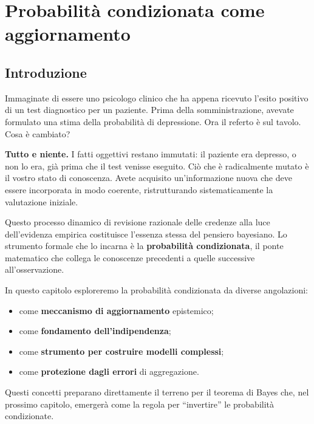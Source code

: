 \documentclass[
  italian,
  letterpaper,
  a4paper,
  11pt,
  open=any]{scrbook}
\providecommand{\tightlist}{%
  \setlength{\itemsep}{0pt}\setlength{\parskip}{0pt}}
\theoremstyle{plain}
\theoremstyle{definition}
\theoremstyle{definition}
\theoremstyle{remark}
\begin{document}
\chapter{Probabilità condizionata come
aggiornamento}\label{sec-prob-conditional-prob}

\section*{Introduzione}\label{introduzione-3}


Immaginate di essere uno psicologo clinico che ha appena ricevuto
l'esito positivo di un test diagnostico per un paziente. Prima della
somministrazione, avevate formulato una stima della probabilità di
depressione. Ora il referto è sul tavolo. Cosa è cambiato?

\textbf{Tutto e niente.} I fatti oggettivi restano immutati: il paziente
era depresso, o non lo era, già prima che il test venisse eseguito. Ciò
che è radicalmente mutato è il vostro stato di conoscenza. Avete
acquisito un'informazione nuova che deve essere incorporata in modo
coerente, ristrutturando sistematicamente la valutazione iniziale.

Questo processo dinamico di revisione razionale delle credenze alla luce
dell'evidenza empirica costituisce l'essenza stessa del pensiero
bayesiano. Lo strumento formale che lo incarna è la \textbf{probabilità
condizionata}, il ponte matematico che collega le conoscenze precedenti
a quelle successive all'osservazione.

In questo capitolo esploreremo la probabilità condizionata da diverse
angolazioni:

\begin{itemize}
\tightlist
\item
  come \textbf{meccanismo di aggiornamento} epistemico;
\item
  come \textbf{fondamento dell'indipendenza};
\item
  come \textbf{strumento per costruire modelli complessi};
\item
  come \textbf{protezione dagli errori} di aggregazione.
\end{itemize}

Questi concetti preparano direttamente il terreno per il teorema di
Bayes che, nel prossimo capitolo, emergerà come la regola per
``invertire'' le probabilità condizionate.
\end{document}

